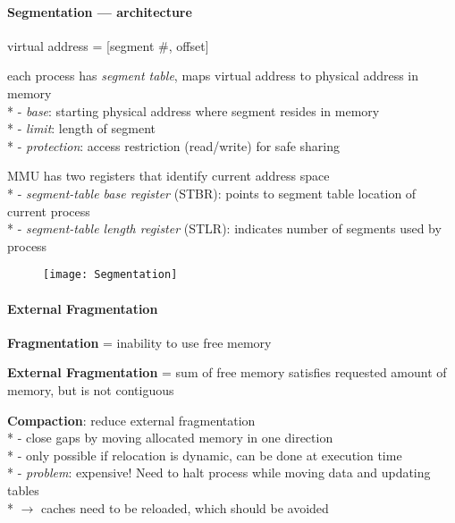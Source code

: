 \paragraph{Segmentation --- architecture}
\begin{items}
  \item virtual address = [segment \#, offset]
  \item each process has \emph{segment table}, maps virtual address to physical address in memory \\*
    - \emph{base}: starting physical address where segment resides in memory \\*
    - \emph{limit}: length of segment \\*
    - \emph{protection}: access restriction (read/write) for safe sharing
  \item MMU has two registers that identify current address space \\*
    - \emph{segment-table base register} (STBR): points to segment table location of current process \\*
    - \emph{segment-table length register} (STLR): indicates number of segments used by process
\end{items}
\begin{figure}[H]\centering\label{Segmentation}\texttt{[image: Segmentation]}\end{figure}

\paragraph{External Fragmentation}
\begin{items}
  \item \textbf{Fragmentation} = inability to use free memory
  \item \textbf{External Fragmentation} = sum of free memory satisfies requested amount of memory, but is not contiguous
  \item \textbf{Compaction}: reduce external fragmentation \\*
    - close gaps by moving allocated memory in one direction \\*
    - only possible if relocation is dynamic, can be done at execution time \\*
    - \emph{problem}: expensive! Need to halt process while moving data and updating tables \\*
      \phantom{-} \( \to \) caches need to be reloaded, which should be avoided
\end{items}

